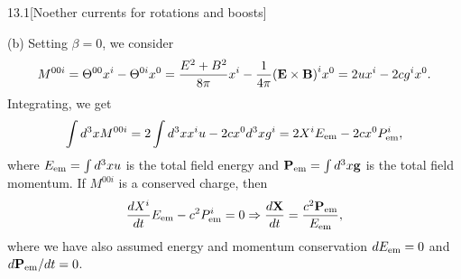 \documentclass[12pt]{article}
\begin{document}
\begin{problem}{13.1}[Noether currents for rotations and boosts]
\begin{solution}
(b) Setting $\beta=0$, we consider
\begin{equation}
    M^{00i}=\Theta^{00}x^i-\Theta^{0i}x^0
    =\frac{E^2+B^2}{8\pi}x^i-\frac1{4\pi}\qty(\vb{E}\times\vb{B})^ix^0
    =2ux^i-2cg^ix^0.
\end{equation}
Integrating, we get
\begin{equation}
    \int d^3xM^{00i}=2\int d^3xx^iu-2cx^0d^3x g^i
    =2X^iE_{\text{em}}-2cx^0P_{\text{em}}^i,
\end{equation}
where $E_{\text{em}}=\int d^3x u$ is the total field energy and $\vb{P}_{\text{em}}=\int
d^3x\vb{g}$ is the total field momentum. If $M^{00i}$ is a conserved charge,
then
\begin{equation}
    \frac{dX^i}{dt}E_{\text{em}}-c^2P_{\text{em}}^i=0
    \Rightarrow\frac{d\vb{X}}{dt}=\frac{c^2\vb{P}_{\text{em}}}{E_{\text{em}}},
\end{equation}
where we have also assumed energy and momentum conservation $dE_{\text{em}}=0$ and
$d\vb{P}_{\text{em}}/dt=0$.
\end{solution}
\end{problem}
\newpage
\end{document}
